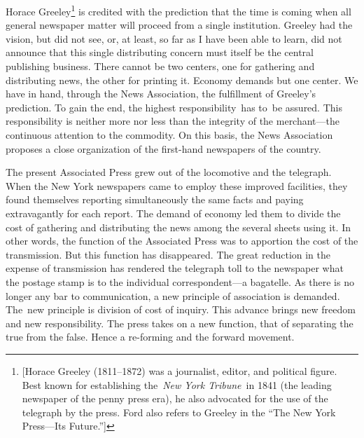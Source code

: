 \documentclass[twoside,symmetric,nobib,justified]{tufte-book}
\begin{document}
Horace Greeley\footnote{{[}Horace Greeley (1811--1872) was a journalist,
  editor, and political figure. Best known for establishing
  the~\emph{New York Tribune}~in 1841 (the leading newspaper of the
  penny press era), he also advocated for the use of the telegraph by
  the press. Ford also refers to Greeley in the ``The New York
  Press---Its Future.''{]}} is credited with the prediction that the
time is coming when all general newspaper matter will proceed from a
single institution. Greeley had the vision, but did not see, or, at
least, so far as I have been able to learn, did not announce that this
single distributing concern must itself be the central publishing
business. There cannot be two centers, one for gathering and
distributing news, the other for printing it. Economy demands but one
center. We have in hand, through the News Association, the fulfillment
of Greeley's prediction. To gain the end, the highest responsibility~has
to~be assured. This responsibility is neither more nor less than the
integrity of the merchant---the continuous attention to the commodity.
On this basis, the News Association proposes a close organization of the
first-hand newspapers of the country.~

The present Associated Press grew out of the locomotive and the
telegraph. When the New York newspapers came to employ these improved
facilities, they found themselves reporting simultaneously the same
facts and paying extravagantly for each report. The demand of economy
led them to divide the cost of gathering and distributing the news among
the several sheets using it. In other words, the function of the
Associated Press was to apportion the cost of the transmission. But this
function has disappeared. The great reduction in the expense of
transmission has rendered the telegraph toll to the newspaper what the
postage stamp is to the individual correspondent---a bagatelle. As there
is no longer any bar to communication, a new principle of association is
demanded. The~new principle is division of cost of inquiry. This advance
brings new freedom and new responsibility. The press takes on a new
function, that of separating the true from the false. Hence a re-forming
and the forward movement.~
\end{document}
